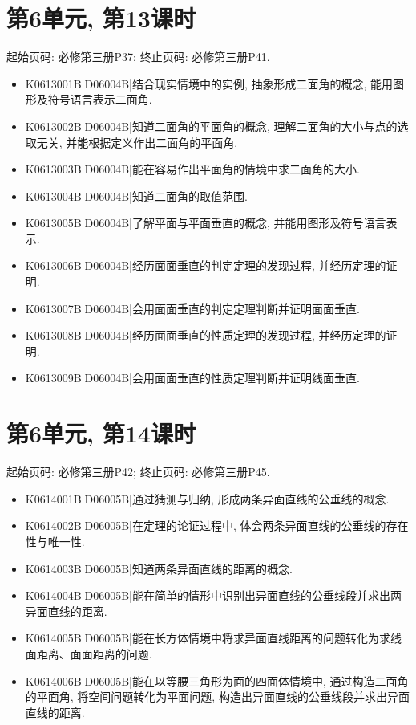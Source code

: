 \section*{第6单元, 第13课时}
起始页码: 必修第三册P37; 终止页码: 必修第三册P41.
\begin{itemize}
\item K0613001B|D06004B|结合现实情境中的实例, 抽象形成二面角的概念, 能用图形及符号语言表示二面角.
\item K0613002B|D06004B|知道二面角的平面角的概念, 理解二面角的大小与点的选取无关, 并能根据定义作出二面角的平面角.
\item K0613003B|D06004B|能在容易作出平面角的情境中求二面角的大小.
\item K0613004B|D06004B|知道二面角的取值范围.
\item K0613005B|D06004B|了解平面与平面垂直的概念, 并能用图形及符号语言表示.
\item K0613006B|D06004B|经历面面垂直的判定定理的发现过程, 并经历定理的证明.
\item K0613007B|D06004B|会用面面垂直的判定定理判断并证明面面垂直.
\item K0613008B|D06004B|经历面面垂直的性质定理的发现过程, 并经历定理的证明.
\item K0613009B|D06004B|会用面面垂直的性质定理判断并证明线面垂直.
\end{itemize}

\section*{第6单元, 第14课时}
起始页码: 必修第三册P42; 终止页码: 必修第三册P45.
\begin{itemize}
\item K0614001B|D06005B|通过猜测与归纳, 形成两条异面直线的公垂线的概念.
\item K0614002B|D06005B|在定理的论证过程中, 体会两条异面直线的公垂线的存在性与唯一性.
\item K0614003B|D06005B|知道两条异面直线的距离的概念.
\item K0614004B|D06005B|能在简单的情形中识别出异面直线的公垂线段并求出两异面直线的距离.
\item K0614005B|D06005B|能在长方体情境中将求异面直线距离的问题转化为求线面距离、面面距离的问题.
\item K0614006B|D06005B|能在以等腰三角形为面的四面体情境中, 通过构造二面角的平面角, 将空间问题转化为平面问题, 构造出异面直线的公垂线段并求出异面直线的距离.
\end{itemize}

